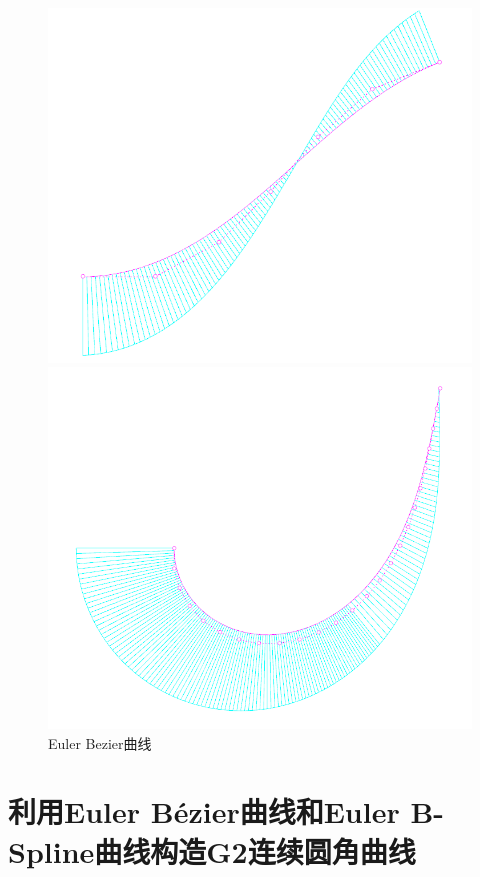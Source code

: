\documentclass[utf8]{ctexart} %
\begin{document}
		\begin{figure}[htbp]
			\centering
			\begin{minipage}{0.49\linewidth}
				\centering
				\includegraphics[width=0.9\linewidth]{figures/EulerBezierDef1.png}
			\end{minipage}
			\begin{minipage}{0.49\linewidth}
				\centering
				\includegraphics[width=0.9\linewidth]{figures/EulerBezierDef2.png}
			\end{minipage}
			\caption{Euler Bezier曲线}
		\end{figure}
		
		
		\section{利用Euler B\'{e}zier曲线和Euler B-Spline曲线构造G2连续圆角曲线}
\end{document}
